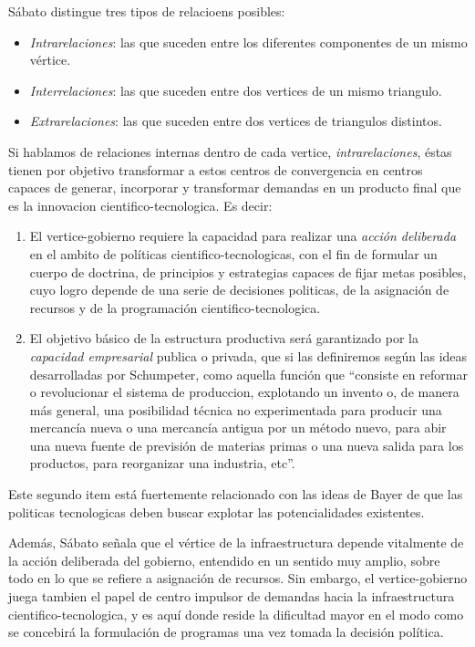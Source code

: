 Sábato distingue tres tipos de relacioens posibles:

\begin{itemize}
    \item \textit{Intrarelaciones}: las que suceden entre los diferentes componentes de un mismo vértice.
    \item \textit{Interrelaciones}: las que suceden entre dos vertices de un mismo triangulo.
    \item \textit{Extrarelaciones}: las que suceden entre dos vertices de triangulos distintos.
\end{itemize}


Si hablamos de relaciones internas dentro de cada vertice, \textit{intrarelaciones}, éstas tienen por objetivo transformar a estos centros de convergencia
en centros capaces de generar, incorporar y transformar demandas en un producto final que es la innovacion cientifico-tecnologica. Es decir:

\begin{enumerate}
    \item El vertice-gobierno requiere la capacidad para realizar una \textit{acción deliberada} en el ambito de políticas cientifico-tecnologicas, con el fin de formular un cuerpo de doctrina, de principios y estrategias capaces de fijar metas posibles, cuyo logro depende de una serie de decisiones politicas, de la asignación de recursos y de la programación cientifico-tecnologica.
    \item El objetivo básico de la estructura productiva será garantizado por la \textit{capacidad empresarial} publica o privada, que si las definiremos según las ideas desarrolladas por Schumpeter, como aquella función que ``consiste en reformar o revolucionar el sistema de produccion, explotando un invento o, de manera más general, una posibilidad técnica no experimentada para producir una mercancía nueva o una mercancía antigua por un método nuevo, para abir una nueva fuente de previsión de materias primas o una nueva salida para los productos, para reorganizar una industria, etc''.
\end{enumerate}

Este segundo item está fuertemente relacionado con las ideas de Bayer de que las politicas tecnologicas deben buscar explotar las potencialidades existentes.

Además, Sábato señala que el vértice de la infraestructura depende vitalmente de la acción deliberada del gobierno, entendido en un sentido muy amplio, sobre todo en lo que se refiere a asignación de recursos. Sin embargo, el vertice-gobierno juega tambien el papel de centro impulsor de demandas hacia la infraestructura cientifico-tecnologica, y es aquí donde reside la dificultad mayor en el modo como se concebirá la formulación de programas una vez tomada la decisión política.


